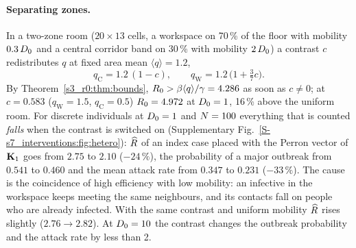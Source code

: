 \paragraph{Separating zones.} In a two-zone room ($20\times13$ cells, a workspace on 70\,\% of the floor with
mobility $0.3\,D_0$ and a central corridor band on 30\,\% with mobility $2\,D_0$) a contrast $c$ redistributes $q$
at fixed area mean $\langle q\rangle=1.2$,
\begin{equation}\label{s7_interventions:eq:contrast}
  q_{\mathrm C}=1.2\,(1-c),\qquad q_{\mathrm W}=1.2\,\bigl(1+\tfrac37c\bigr).
\end{equation}
By Theorem~\ref{s3_r0:thm:bounds}, $R_0>\beta\langle q\rangle/\gamma=4.286$ as soon as $c\ne0$; at $c=0.583$
($q_{\mathrm W}=1.5$, $q_{\mathrm C}=0.5$) $R_0=4.972$ at $D_0=1$, 16\,\% above the uniform room. For discrete
individuals at $D_0=1$ and $N=100$ everything that is counted \emph{falls} when the contrast is switched on
(Supplementary Fig.~\ref{S-s7_interventions:fig:hetero}): $\widehat{R}$ of an index case placed with the Perron vector of $\mathbf{K}_1$ goes
from $2.75$ to $2.10$ ($-24\,\%$), the probability of a major outbreak from $0.541$ to $0.460$ and the mean attack
rate from $0.347$ to $0.231$ ($-33\,\%$). The cause is the coincidence of high efficiency with low mobility: an
infective in the workspace keeps meeting the same neighbours, and its contacts fall on people who are already
infected. With the same contrast and uniform mobility $\widehat{R}$ rises slightly ($2.76\to2.82$). At $D_0=10$ the
contrast changes the outbreak probability and the attack rate by less than 2\pct.

